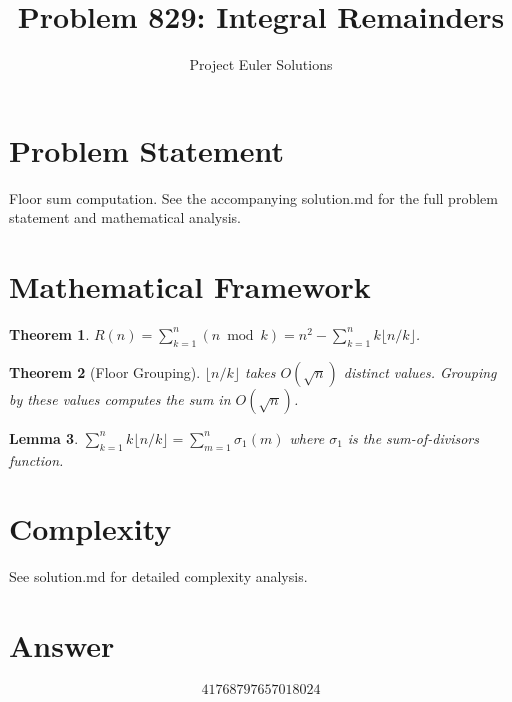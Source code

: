 \documentclass[11pt]{article}
\title{Problem 829: Integral Remainders}
\author{Project Euler Solutions}
\date{}
\newtheorem{theorem}{Theorem}
\newtheorem{lemma}[theorem]{Lemma}
\begin{document}
\maketitle

\section{Problem Statement}

Floor sum computation. See the accompanying solution.md for the full problem statement and mathematical analysis.

\section{Mathematical Framework}

\begin{theorem}
$R(n) = \sum_{k=1}^{n} (n \bmod k) = n^2 - \sum_{k=1}^{n} k\lfloor n/k \rfloor$.
\end{theorem}

\begin{theorem}[Floor Grouping]
$\lfloor n/k \rfloor$ takes $O(\sqrt{n})$ distinct values. Grouping by these values computes the sum in $O(\sqrt{n})$.
\end{theorem}

\begin{lemma}
$\sum_{k=1}^{n} k\lfloor n/k\rfloor = \sum_{m=1}^{n} \sigma_1(m)$ where $\sigma_1$ is the sum-of-divisors function.
\end{lemma}

\section{Complexity}

See solution.md for detailed complexity analysis.

\section{Answer}

\[
\boxed{41768797657018024}
\]
\end{document}
